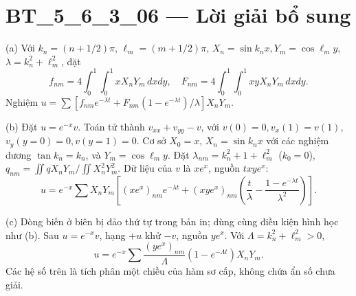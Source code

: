 \documentclass[10pt,a4paper]{article}
\begin{document}
\section*{BT\_5\_6\_3\_06 — Lời giải bổ sung}
(a) Với $k_n=(n+1/2)\pi$, $\ell_m=(m+1/2)\pi$, $X_n=\sin k_nx,Y_m=\cos\ell_my$, $\lambda=k_n^2+\ell_m^2$, đặt
\[f_{nm}=4\int_0^1\int_0^1xX_nY_m\,dxdy,\quad F_{nm}=4\int_0^1\int_0^1xyX_nY_m\,dxdy.\]
Nghiệm $u=\sum[f_{nm}e^{-\lambda t}+F_{nm}(1-e^{-\lambda t})/\lambda]X_nY_m$.

(b) Đặt $u=e^{-x}v$. Toán tử thành $v_{xx}+v_{yy}-v$, với $v(0)=0,v_x(1)=v(1)$, $v_y(y=0)=0,v(y=1)=0$. Cơ sở $X_0=x$, $X_n=\sin k_nx$ với các nghiệm dương $\tan k_n=k_n$, và $Y_m=\cos\ell_my$. Đặt $\lambda_{nm}=k_n^2+1+\ell_m^2$ ($k_0=0$), $q_{nm}=\iint qX_nY_m/\iint X_n^2Y_m^2$. Dữ liệu của $v$ là $xe^x$, nguồn $txy e^x$:
\[u=e^{-x}\sum X_nY_m\left[(xe^x)_{nm}e^{-\lambda t}+(xy e^x)_{nm}\left(\frac t\lambda-\frac{1-e^{-\lambda t}}{\lambda^2}\right)\right].\]

(c) Dòng biến ở biên bị đảo thứ tự trong bản in; dùng cùng điều kiện hình học như (b). Sau $u=e^{-x}v$, hạng $+u$ khử $-v$, nguồn $ye^x$. Với $\Lambda=k_n^2+\ell_m^2>0$,
\[u=e^{-x}\sum\frac{(ye^x)_{nm}}\Lambda(1-e^{-\Lambda t})X_nY_m.\]
Các hệ số trên là tích phân một chiều của hàm sơ cấp, không chứa ẩn số chưa giải.
\end{document}

